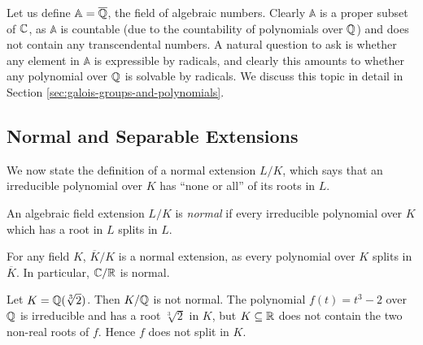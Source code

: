 Let us define $\mathbb A = \overline {\mathbb Q}$, the field of algebraic numbers. Clearly $\mathbb A$ is a proper subset of $\mathbb C$, as $\mathbb A$ is countable (due to the countability of polynomials over $\mathbb Q$) and does not contain any transcendental numbers. A natural question to ask is whether any element in $\mathbb A$ is expressible by radicals, and clearly this amounts to whether any polynomial over $\mathbb Q$ is solvable by radicals. We discuss this topic in detail in Section \ref{sec:galois-groups-and-polynomials}. 

%
%

%



\subsection{Normal and Separable Extensions}

We now state the definition of a normal extension $L/K$, which says that an irreducible polynomial over $K$ has ``none or all'' of its roots in $L$. 

\begin{definition}
    An algebraic field extension $L/ K$ is \textit{normal} if every irreducible polynomial over $K$ which has a root in $L$ splits in $L$. 
\end{definition}

\begin{example}
	For any field $K$, $\overline K / K$ is a normal extension, as every polynomial over $K$ splits in $\overline K$. In particular, $\mathbb C / \mathbb R$ is normal. 
\end{example}


\begin{example}
    Let $K = \mathbb Q(\sqrt[3]{2})$. Then $K / \mathbb Q$ is not normal. The polynomial $f(t) = t^3 - 2$ over $\mathbb Q$ is irreducible and has a root $\sqrt[3]{2}$ in $K$, but $K \subseteq \mathbb R$ does not contain the two non-real roots of $f$. Hence $f$ does not split in $K$.
\end{example}


